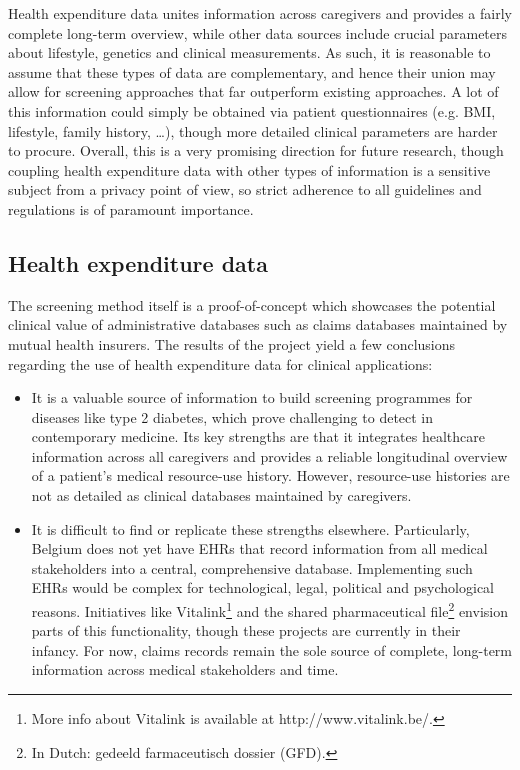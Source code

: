 Health expenditure data unites information across caregivers and provides a fairly complete long-term overview, while other data sources include crucial parameters about lifestyle, genetics and clinical measurements. As such, it is reasonable to assume that these types of data are complementary, and hence their union may allow for screening approaches that far outperform existing approaches. A lot of this information could simply be obtained via patient questionnaires (e.g. BMI, lifestyle, family history, \ldots), though more detailed clinical parameters are harder to procure. Overall, this is a very promising direction for future research, though coupling health expenditure data with other types of information is a sensitive subject from a privacy point of view, so strict adherence to all guidelines and regulations is of paramount importance. 

\subsection{Health expenditure data}
The screening method itself is a proof-of-concept which showcases the potential clinical value of administrative databases such as claims databases maintained by mutual health insurers. The results of the project yield a few conclusions regarding the use of health expenditure data for clinical applications:

\begin{itemize}
\item It is a valuable source of information to build screening programmes for diseases like type 2 diabetes, which prove challenging to detect in contemporary medicine. Its key strengths are that it integrates healthcare information across all caregivers and provides a reliable longitudinal overview of a patient's medical resource-use history. However, resource-use histories are not as detailed as clinical databases maintained by caregivers.
\item It is difficult to find or replicate these strengths elsewhere. Particularly, Belgium does not yet have EHRs that record information from all medical stakeholders into a central, comprehensive database. Implementing such EHRs would be complex for technological, legal, political and psychological reasons. Initiatives like Vitalink\footnote{More info about Vitalink is available at http://www.vitalink.be/.} and the shared pharmaceutical file\footnote{In Dutch: gedeeld farmaceutisch dossier (GFD).} envision parts of this functionality, though these projects are currently in their infancy. For now, claims records remain the sole source of complete, long-term information across medical stakeholders and time.
\end{itemize}


